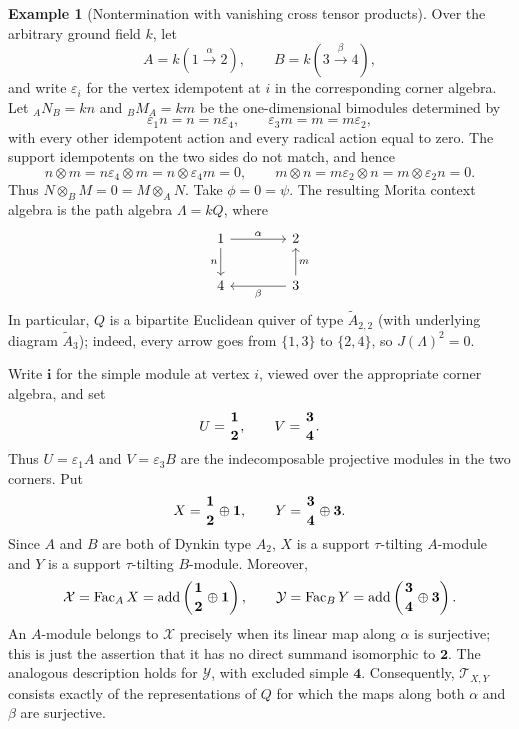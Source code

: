 \documentclass[11pt,reqno]{amsart}
\theoremstyle{definition}
\newtheorem{example}[theorem]{Example}
\theoremstyle{remark}
\newcommand{\Fac}{\operatorname{Fac}}
\newcommand{\addc}{\operatorname{add}}
\numberwithin{equation}{section}
\begin{document}
\begin{example}[Nontermination with vanishing cross tensor products]
\label{ex:zero-products}
Over the arbitrary ground field $k$, let
\[
 A=k(1\xrightarrow{\alpha}2),
 \qquad
 B=k(3\xrightarrow{\beta}4),
\]
and write $\varepsilon_i$ for the vertex idempotent at $i$ in the
corresponding corner algebra.  Let ${}_AN_B=kn$ and ${}_BM_A=km$ be the
one-dimensional bimodules determined by
\[
 \varepsilon_1n=n=n\varepsilon_4,
 \qquad
 \varepsilon_3m=m=m\varepsilon_2,
\]
with every other idempotent action and every radical action equal to zero.
The support idempotents on the two sides do not match, and hence
\[
 n\otimes m=n\varepsilon_4\otimes m
   =n\otimes\varepsilon_4m=0,
 \qquad
 m\otimes n=m\varepsilon_2\otimes n
   =m\otimes\varepsilon_2n=0.
\]
Thus $N\otimes_BM=0=M\otimes_AN$.  Take $\phi=0=\psi$.  The resulting
Morita context algebra is the path algebra $\Lambda=kQ$, where
\[
\begin{tikzcd}[column sep=4em,row sep=2em]
 1 \arrow[r,"\alpha"] \arrow[d,"n"'] & 2 \\
 4 & 3 \arrow[l,"\beta"] \arrow[u,"m"']
\end{tikzcd}
\]
In particular, $Q$ is a bipartite Euclidean quiver of type
$\widetilde A_{2,2}$ (with underlying diagram $\widetilde A_3$); indeed, every
arrow goes from $\{1,3\}$ to $\{2,4\}$, so $J(\Lambda)^2=0$.

Write $\mathbf i$ for the simple module at vertex $i$, viewed over the
appropriate corner algebra, and set
\[
 U=\genfrac{}{}{0pt}{}{\mathbf 1}{\mathbf 2},
 \qquad
 V=\genfrac{}{}{0pt}{}{\mathbf 3}{\mathbf 4}.
\]
Thus $U=\varepsilon_1A$ and $V=\varepsilon_3B$ are the indecomposable
projective modules in the two corners.  Put
\[
 X=\genfrac{}{}{0pt}{}{\mathbf 1}{\mathbf 2}\oplus\mathbf 1,
 \qquad
 Y=\genfrac{}{}{0pt}{}{\mathbf 3}{\mathbf 4}\oplus\mathbf 3.
\]
Since $A$ and $B$ are both of Dynkin type $A_2$, $X$ is a support
$\tau$-tilting $A$-module and $Y$ is a support $\tau$-tilting $B$-module.
Moreover,
\[
 \mathcal X=\Fac_AX
 =\addc\left(
   \genfrac{}{}{0pt}{}{\mathbf 1}{\mathbf 2}\oplus\mathbf 1
 \right),
 \qquad
 \mathcal Y=\Fac_BY
 =\addc\left(
   \genfrac{}{}{0pt}{}{\mathbf 3}{\mathbf 4}\oplus\mathbf 3
 \right).
\]
An $A$-module belongs to $\mathcal X$ precisely when its linear map along
$\alpha$ is surjective; this is just the assertion that it has no direct
summand isomorphic to $\mathbf 2$.  The analogous description holds for
$\mathcal Y$, with excluded simple $\mathbf 4$.
Consequently, $\mathcal T_{X,Y}$ consists exactly of the representations of
$Q$ for which the maps along both $\alpha$ and $\beta$ are surjective.


\end{example}
\end{document}
